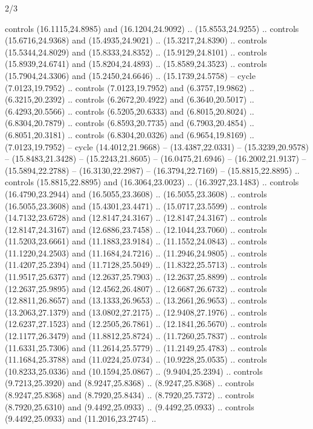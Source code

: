 \begin{flagdescription}{2/3}
{\begin{scope}[xshift=0.5\flaglength,yshift=0.5\flagwidth,scale=\flagwidth/33.602]
\begin{scope}[y=0.8pt, x=0.8pt, yscale=-1,shift={(-12,-26)}]
    controls (16.1115,24.8985) and (16.1204,24.9092) .. (15.8553,24.9255) ..
    controls (15.6716,24.9368) and (15.4935,24.9021) .. (15.3217,24.8390) ..
    controls (15.5344,24.8029) and (15.8333,24.8352) .. (15.9129,24.8101) ..
    controls (15.8939,24.6741) and (15.8204,24.4893) .. (15.8589,24.3523) ..
    controls (15.7904,24.3306) and (15.2450,24.6646) .. (15.1739,24.5758) --
    cycle (7.0123,19.7952) ..
    controls (7.0123,19.7952) and (6.3757,19.9862) .. (6.3215,20.2392) .. controls
    (6.2672,20.4922) and (6.3640,20.5017) .. (6.4293,20.5566) .. controls
    (6.5205,20.6333) and (6.8015,20.8024) .. (6.8304,20.7879) .. controls
    (6.8593,20.7735) and (6.7903,20.4854) .. (6.8051,20.3181) .. controls
    (6.8304,20.0326) and (6.9654,19.8169) .. (7.0123,19.7952) -- cycle (14.4012,21.9668) --
    (13.4387,22.0331) -- (15.3239,20.9578) -- (15.8483,21.3428) --
    (15.2243,21.8605) -- (16.0475,21.6946) -- (16.2002,21.9137) --
    (15.5894,22.2788) -- (16.3130,22.2987) -- (16.3794,22.7169) --
    (15.8815,22.8895) .. controls (15.8815,22.8895) and (16.3064,23.0023) ..
    (16.3927,23.1483) .. controls (16.4790,23.2944) and (16.5055,23.3608) ..
    (16.5055,23.3608) .. controls (16.5055,23.3608) and (15.4301,23.4471) ..
    (15.0717,23.5599) .. controls (14.7132,23.6728) and (12.8147,24.3167) ..
    (12.8147,24.3167) .. controls (12.8147,24.3167) and (12.6886,23.7458) ..
    (12.1044,23.7060) .. controls (11.5203,23.6661) and (11.1883,23.9184) ..
    (11.1552,24.0843) .. controls (11.1220,24.2503) and (11.1684,24.7216) ..
    (11.2946,24.9805) .. controls (11.4207,25.2394) and (11.7128,25.5049) ..
    (11.8322,25.5713) .. controls (11.9517,25.6377) and (12.2637,25.7903) ..
    (12.2637,25.8899) .. controls (12.2637,25.9895) and (12.4562,26.4807) ..
    (12.6687,26.6732) .. controls (12.8811,26.8657) and (13.1333,26.9653) ..
    (13.2661,26.9653) .. controls (13.2063,27.1379) and (13.0802,27.2175) ..
    (12.9408,27.1976) .. controls (12.6237,27.1523) and (12.2505,26.7861) ..
    (12.1841,26.5670) .. controls (12.1177,26.3479) and (11.8812,25.8724) ..
    (11.7260,25.7837) .. controls (11.6331,25.7306) and (11.2614,25.5779) ..
    (11.2149,25.4783) .. controls (11.1684,25.3788) and (11.0224,25.0734) ..
    (10.9228,25.0535) .. controls (10.8233,25.0336) and (10.1594,25.0867) ..
    (9.9404,25.2394) .. controls (9.7213,25.3920) and (8.9247,25.8368) ..
    (8.9247,25.8368) .. controls (8.9247,25.8368) and (8.7920,25.8434) ..
    (8.7920,25.7372) .. controls (8.7920,25.6310) and (9.4492,25.0933) ..
    (9.4492,25.0933) .. controls (9.4492,25.0933) and (11.2016,23.2745) ..

\end{scope}
\end{scope}}
\end{flagdescription}

